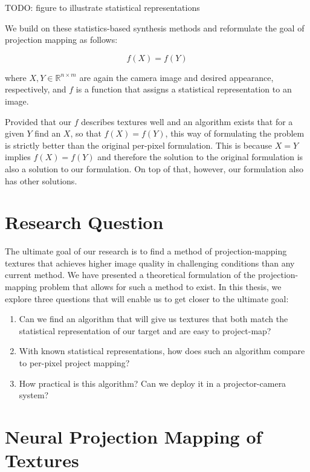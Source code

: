 {\color{red} TODO: figure to illustrate statistical representations}

We build on these statistics-based synthesis methods and reformulate the goal of projection mapping as follows:

\[
    f(X) = f(Y)
\]

where \(X,Y \in \mathbb{R}^{n \times m}\) are again the camera image and desired appearance, respectively, and \(f\) is a function that assigns a statistical representation to an image.

Provided that our \(f\) describes textures well and an algorithm exists that for a given \(Y\) find an \(X\), so that \(f(X) = f(Y)\), this way of formulating the problem is strictly better than the original per-pixel formulation. This is because \(X = Y\) implies \(f(X) = f(Y)\) and therefore the solution to the original formulation is also a solution to our formulation. On top of that, however, our formulation also has other solutions.

\section{Research Question}
\label{section:intro-research_question}

The ultimate goal of our research is to find a method of projection-mapping textures that achieves higher image quality in challenging conditions than any current method. We have presented a theoretical formulation of the projection-mapping problem that allows for such a method to exist. In this thesis, we explore three questions that will enable us to get closer to the ultimate goal:

\begin{enumerate}
    \item Can we find an algorithm that will give us textures that both match the statistical representation of our target and are easy to project-map?
    \item With known statistical representations, how does such an algorithm compare to per-pixel project mapping?
    \item How practical is this algorithm? Can we deploy it in a projector-camera system?
\end{enumerate}

\section{Neural Projection Mapping of Textures}
\label{section:intro-neural_projection_mapping}

